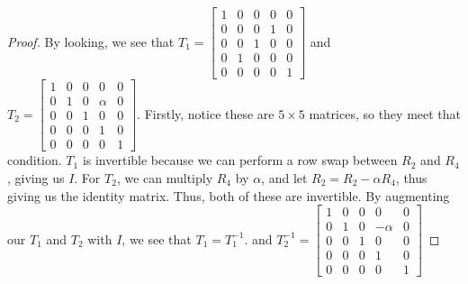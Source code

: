 \documentclass{amsart}
\begin{document}
\begin{proof}
    By looking, we see that $T_1 = \begin{bmatrix}
        1 &0&0&0&0 \\ 
        0&0&0&1&0 \\ 
        0&0&1&0&0 \\ 
        0&1&0&0&0 \\ 
        0&0&0&0&1
    \end{bmatrix}$ and $T_2 = \begin{bmatrix}
        1 &0&0&0&0 \\ 
        0&1&0&\alpha&0 \\ 
        0&0&1&0&0 \\ 
        0&0&0&1&0 \\ 
        0&0&0&0&1
    \end{bmatrix}$. Firstly, notice these are $5 \times 5$ matrices, so they meet that condition. $T_1$ is invertible because we can perform a row swap between $R_2$ and $R_4$, giving us $I$. For $T_2$, we can multiply $R_4$ by $\alpha$, and let $R_2 = R_2 - \alpha R_4$, thus giving us the identity matrix. Thus, both of these are invertible. 
    By augmenting our $T_1$ and $T_2$ with $I$, we see that $T_1 = T_1^{-1}$. and $T_2^{-1} = \begin{bmatrix}
         1 &0&0&0&0 \\ 
        0&1&0&-\alpha&0 \\ 
        0&0&1&0&0 \\ 
        0&0&0&1&0 \\ 
        0&0&0&0&1
    \end{bmatrix}$
\end{proof}
\end{document}
